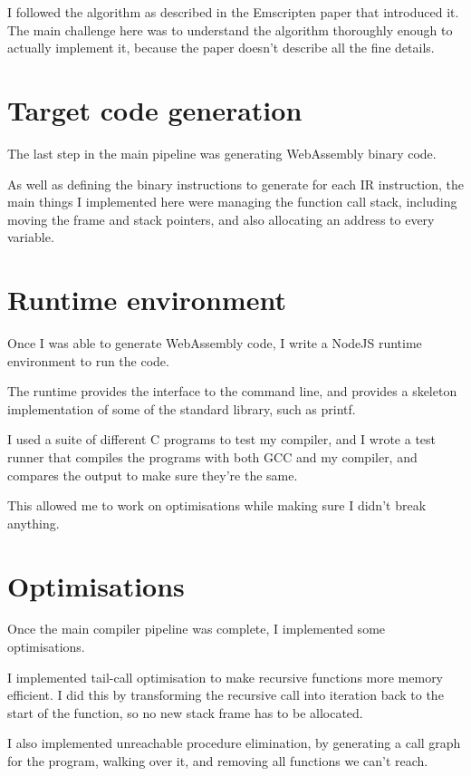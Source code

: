 \documentclass[12pt, a4paper]{article}
\begin{document}
I followed the algorithm as described in the Emscripten paper that introduced it.
The main challenge here was to understand the algorithm thoroughly enough to actually implement it, because the paper doesn't describe all the fine details.


\section*{Target code generation}

The last step in the main pipeline was generating WebAssembly binary code.

As well as defining the binary instructions to generate for each IR instruction, the main things I implemented here were managing the function call stack, including moving the frame and stack pointers, and also allocating an address to every variable.


\section*{Runtime environment}

Once I was able to generate WebAssembly code, I write a NodeJS runtime environment to run the code.

The runtime provides the interface to the command line, and provides a skeleton implementation of some of the standard library, such as printf.

I used a suite of different C programs to test my compiler, and I wrote a test runner that compiles the programs with both GCC and my compiler, and compares the output to make sure they're the same.

This allowed me to work on optimisations while making sure I didn't break anything.


\section*{Optimisations}

Once the main compiler pipeline was complete, I implemented some optimisations.

I implemented tail-call optimisation to make recursive functions more memory efficient. I did this by transforming the recursive call into iteration back to the start of the function, so no new stack frame has to be allocated.

I also implemented unreachable procedure elimination, by generating a call graph for the program, walking over it, and removing all functions we can't reach.
\end{document}
